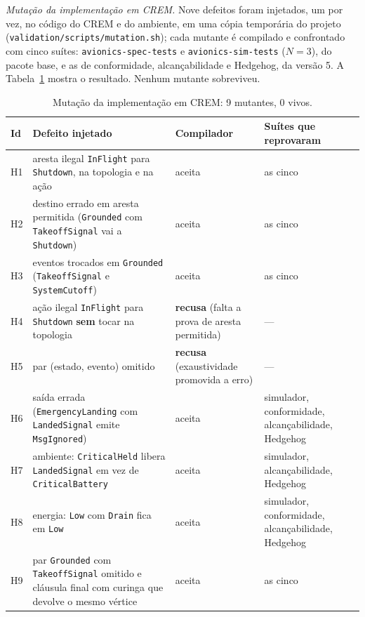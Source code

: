 \documentclass[12pt,a4paper]{article}
\begin{document}
\textit{Mutação da implementação em CREM.} Nove defeitos foram injetados, um por vez, no código do CREM e do ambiente, em uma cópia temporária do projeto (\texttt{validation/scripts/mutation.sh}); cada mutante é compilado e confrontado com cinco suítes: \texttt{avionics-spec-tests} e \texttt{avionics-sim-tests} ($N = 3$), do pacote base, e as de conformidade, alcançabilidade e Hedgehog, da versão 5. A Tabela~\ref{tab:mutacao} mostra o resultado. Nenhum mutante sobreviveu.

\begin{table}[h]
\centering
\footnotesize
\begin{tabular}{|p{0.8cm}|p{6.2cm}|p{3.0cm}|p{4.2cm}|}
\hline
Id & Defeito injetado & Compilador & Suítes que reprovaram \\
\hline
H1 & aresta ilegal \texttt{InFlight} para \texttt{Shutdown}, na topologia e na ação & aceita & as cinco \\
\hline
H2 & destino errado em aresta permitida (\texttt{Grounded} com \texttt{TakeoffSignal} vai a \texttt{Shutdown}) & aceita & as cinco \\
\hline
H3 & eventos trocados em \texttt{Grounded} (\texttt{TakeoffSignal} e \texttt{SystemCutoff}) & aceita & as cinco \\
\hline
H4 & ação ilegal \texttt{InFlight} para \texttt{Shutdown} \textbf{sem} tocar na topologia & \textbf{recusa} (falta a prova de aresta permitida) & --- \\
\hline
H5 & par (estado, evento) omitido & \textbf{recusa} (exaustividade promovida a erro) & --- \\
\hline
H6 & saída errada (\texttt{EmergencyLanding} com \texttt{LandedSignal} emite \texttt{MsgIgnored}) & aceita & simulador, conformidade, alcançabilidade, Hedgehog \\
\hline
H7 & ambiente: \texttt{CriticalHeld} libera \texttt{LandedSignal} em vez de \texttt{CriticalBattery} & aceita & simulador, alcançabilidade, Hedgehog \\
\hline
H8 & energia: \texttt{Low} com \texttt{Drain} fica em \texttt{Low} & aceita & simulador, conformidade, alcançabilidade, Hedgehog \\
\hline
H9 & par \texttt{Grounded} com \texttt{TakeoffSignal} omitido e cláusula final com curinga que devolve o mesmo vértice & aceita & as cinco \\
\hline
\end{tabular}
\caption{Mutação da implementação em CREM: 9 mutantes, 0 vivos.}
\label{tab:mutacao}
\end{table}
\end{document}
